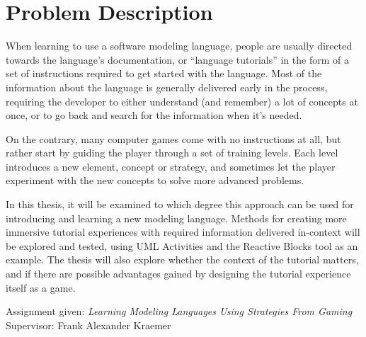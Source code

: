 \chapter*{Problem Description}
When learning to use a software modeling language, people are usually directed towards the language's documentation, or ``language tutorials'' in the form of a set of instructions required to get started with the language. Most of the information about the language is generally delivered early in the process, requiring the developer to either understand (and remember) a lot of concepts at once, or to go back and search for the information when it's needed.

\noindent
On the contrary, many computer games come with no instructions at all, but rather start by guiding the player through a set of training levels. Each level introduces a new element, concept or strategy, and sometimes let the player experiment with the new concepts to solve more advanced problems.

\noindent
In this thesis, it will be examined to which degree this approach can be used for introducing and learning a new modeling language. Methods for creating more immersive tutorial experiences with required information delivered in-context will be explored and tested, using UML Activities and the Reactive Blocks tool as an example. The thesis will also explore whether the context of the tutorial matters, and if there are possible advantages gained by designing the tutorial experience itself as a game.

\noindent
Assignment given: \emph{Learning Modeling Languages Using Strategies From Gaming} \\
Supervisor: Frank Alexander Kraemer